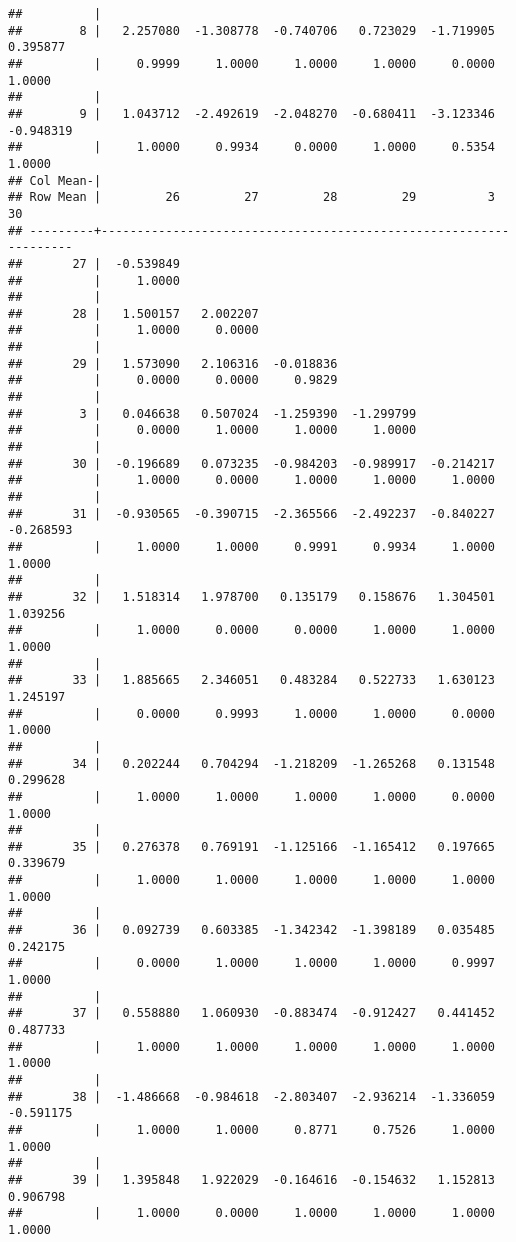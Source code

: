 \documentclass[12pt,]{article}
\begin{document}
\begin{verbatim}
##          |
##        8 |   2.257080  -1.308778  -0.740706   0.723029  -1.719905   0.395877
##          |     0.9999     1.0000     1.0000     1.0000     0.0000     1.0000
##          |
##        9 |   1.043712  -2.492619  -2.048270  -0.680411  -3.123346  -0.948319
##          |     1.0000     0.9934     0.0000     1.0000     0.5354     1.0000
## Col Mean-|
## Row Mean |         26         27         28         29          3         30
## ---------+------------------------------------------------------------------
##       27 |  -0.539849
##          |     1.0000
##          |
##       28 |   1.500157   2.002207
##          |     1.0000     0.0000
##          |
##       29 |   1.573090   2.106316  -0.018836
##          |     0.0000     0.0000     0.9829
##          |
##        3 |   0.046638   0.507024  -1.259390  -1.299799
##          |     0.0000     1.0000     1.0000     1.0000
##          |
##       30 |  -0.196689   0.073235  -0.984203  -0.989917  -0.214217
##          |     1.0000     0.0000     1.0000     1.0000     1.0000
##          |
##       31 |  -0.930565  -0.390715  -2.365566  -2.492237  -0.840227  -0.268593
##          |     1.0000     1.0000     0.9991     0.9934     1.0000     1.0000
##          |
##       32 |   1.518314   1.978700   0.135179   0.158676   1.304501   1.039256
##          |     1.0000     0.0000     0.0000     1.0000     1.0000     1.0000
##          |
##       33 |   1.885665   2.346051   0.483284   0.522733   1.630123   1.245197
##          |     0.0000     0.9993     1.0000     1.0000     0.0000     1.0000
##          |
##       34 |   0.202244   0.704294  -1.218209  -1.265268   0.131548   0.299628
##          |     1.0000     1.0000     1.0000     1.0000     0.0000     1.0000
##          |
##       35 |   0.276378   0.769191  -1.125166  -1.165412   0.197665   0.339679
##          |     1.0000     1.0000     1.0000     1.0000     1.0000     1.0000
##          |
##       36 |   0.092739   0.603385  -1.342342  -1.398189   0.035485   0.242175
##          |     0.0000     1.0000     1.0000     1.0000     0.9997     1.0000
##          |
##       37 |   0.558880   1.060930  -0.883474  -0.912427   0.441452   0.487733
##          |     1.0000     1.0000     1.0000     1.0000     1.0000     1.0000
##          |
##       38 |  -1.486668  -0.984618  -2.803407  -2.936214  -1.336059  -0.591175
##          |     1.0000     1.0000     0.8771     0.7526     1.0000     1.0000
##          |
##       39 |   1.395848   1.922029  -0.164616  -0.154632   1.152813   0.906798
##          |     1.0000     0.0000     1.0000     1.0000     1.0000     1.0000

\end{verbatim}
\end{document}
